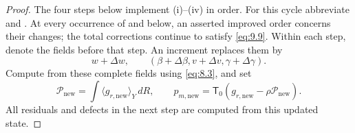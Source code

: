 \begin{proof}
The four steps below implement (i)--(iv) in order. For this cycle abbreviate
 and
. At every occurrence of
 and  below, an asserted improved order concerns
their changes; the total corrections continue to satisfy \eqref{eq:9.9}. Within each step,
 denote the fields before that step. An increment replaces them
by
\[
w+\Delta w,
\qquad
(\beta+\Delta\beta,v+\Delta v,\gamma+\Delta\gamma).
\]
Compute  from these complete fields using \eqref{eq:8.3},
and set
\[
\mathcal P_{\mathrm{new}}=\int\langle g_{r,\mathrm{new}}\rangle_Y\,dR,
\qquad
p_{m,\mathrm{new}}=\mathsf T_0(g_{r,\mathrm{new}}-\rho\mathcal P_{\mathrm{new}}).
\]
All residuals and defects in the next step are computed from this updated state.


\end{proof}
